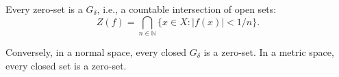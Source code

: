 Every zero-set is a $G_\delta$, i.e., a countable intersection of open sets:
$$Z(f) = \bigcap_{n \in \mathbb{N}} \{x \in X: |f(x)| < 1/n\}.$$

Conversely, in a normal space, every closed $G_\delta$ is a zero-set. In a metric space, every closed set is a zero-set.
